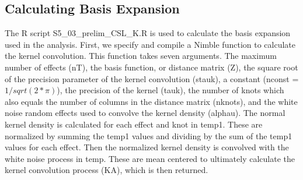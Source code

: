 \documentclass[11pt,]{article}
\newenvironment{Shaded}{\begin{snugshade}}{\end{snugshade}}
\newcommand{\KeywordTok}[1]{\textcolor[rgb]{0.13,0.29,0.53}{\textbf{#1}}}
\newcommand{\StringTok}[1]{\textcolor[rgb]{0.31,0.60,0.02}{#1}}
\newcommand{\OperatorTok}[1]{\textcolor[rgb]{0.81,0.36,0.00}{\textbf{#1}}}
\newcommand{\NormalTok}[1]{#1}
\begin{document}
\begin{Shaded}
\end{Shaded}

\subsection{Calculating Basis
Expansion}\label{calculating-basis-expansion}

The R script S5\_03\_prelim\_CSL\_K.R is used to calculate the basis
expansion used in the analysis. First, we specify and compile a Nimble
function to calculate the kernel convolution. This function takes seven
arguments. The maximum number of effects (nT), the basis function, or
distance matrix (Z), the square root of the precision parameter of the
kernel convolution (stauk), a constant (nconst = \(1 / sqrt(2 * \pi)\)),
the precision of the kernel (tauk), the number of knots which also
equals the number of columns in the distance matrix (nknots), and the
white noise random effects used to convolve the kernel density (alphau).
The normal kernel density is calculated for each effect and knot in
temp1. These are normalized by summing the temp1 values and dividing by
the sum of the temp1 values for each effect. Then the normalized kernel
density is convolved with the white noise process in temp. These are
mean centered to ultimately calculate the kernel convolution process
(KA), which is then returned.
\end{document}
